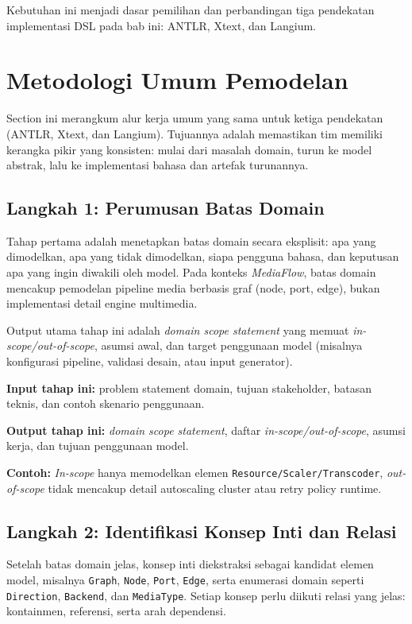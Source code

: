 Kebutuhan ini menjadi dasar pemilihan dan perbandingan tiga pendekatan implementasi DSL pada bab ini: ANTLR, Xtext, dan Langium.

\section{Metodologi Umum Pemodelan}

Section ini merangkum alur kerja umum yang sama untuk ketiga pendekatan (ANTLR, Xtext, dan Langium). Tujuannya adalah memastikan tim memiliki kerangka pikir yang konsisten: mulai dari masalah domain, turun ke model abstrak, lalu ke implementasi bahasa dan artefak turunannya.

\subsection{Langkah 1: Perumusan Batas Domain}

Tahap pertama adalah menetapkan batas domain secara eksplisit: apa yang dimodelkan, apa yang tidak dimodelkan, siapa pengguna bahasa, dan keputusan apa yang ingin diwakili oleh model. Pada konteks \textit{MediaFlow}, batas domain mencakup pemodelan pipeline media berbasis graf (node, port, edge), bukan implementasi detail engine multimedia.

Output utama tahap ini adalah \textit{domain scope statement} yang memuat \textit{in-scope/out-of-scope}, asumsi awal, dan target penggunaan model (misalnya konfigurasi pipeline, validasi desain, atau input generator).

\textbf{Input tahap ini:} problem statement domain, tujuan stakeholder, batasan teknis, dan contoh skenario penggunaan.

\textbf{Output tahap ini:} \textit{domain scope statement}, daftar \textit{in-scope/out-of-scope}, asumsi kerja, dan tujuan penggunaan model.

\textbf{Contoh:} \textit{In-scope} hanya memodelkan elemen \texttt{Resource/Scaler/Transcoder}, \textit{out-of-scope} tidak mencakup detail autoscaling cluster atau retry policy runtime.

\subsection{Langkah 2: Identifikasi Konsep Inti dan Relasi}

Setelah batas domain jelas, konsep inti diekstraksi sebagai kandidat elemen model, misalnya \texttt{Graph}, \texttt{Node}, \texttt{Port}, \texttt{Edge}, serta enumerasi domain seperti \texttt{Direction}, \texttt{Backend}, dan \texttt{MediaType}. Setiap konsep perlu diikuti relasi yang jelas: kontainmen, referensi, serta arah dependensi.

